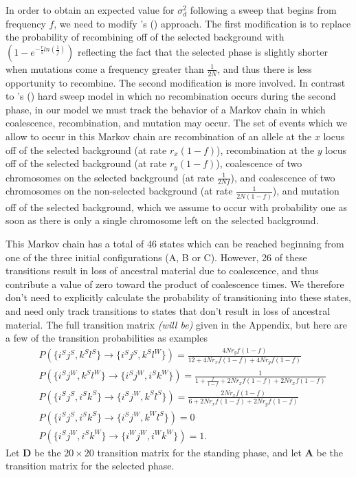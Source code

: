 \documentclass[a4paper,10pt]{article}
\newcommand{\jb}[1]{{\it\color{blue} (#1)} }
\def\citeapos#1{\citeauthor{#1}'s (\citeyear{#1})}
\begin{document}
In order to obtain an expected value for $\sigma_d^2$ following a sweep that begins from frequency $f$, we need to modify \citeapos{McVean:2006ke} approach. The first modification is to replace the probability of recombining off of the selected background with $(1 - e^{-\frac{r}{s}ln(\frac{1}{f})})$ reflecting the fact that the selected phase is slightly shorter when mutations come a frequency greater than $\frac{1}{2N}$, and thus there is less opportunity to recombine. The second modification is more involved. In contrast to \citeapos{McVean:2006ke} hard sweep model in which no recombination occurs during the second phase, in our model we must track the behavior of a Markov chain in which coalescence, recombination, and mutation may occur. The set of events which we allow to occur in this Markov chain are recombination of an allele at the $x$ locus off of the selected background (at rate $r_x\left(1-f\right)$), recombination at the $y$ locus off of the selected background (at rate $r_y\left(1-f\right)$), coalescence of two chromosomes on the selected background (at rate $\frac{1}{2Nf}$), and coalescence of two chromosomes on the non-selected background (at rate $\frac{1}{2N\left(1-f\right)}$), and mutation off of the selected background, which we assume to occur with probability one as soon as there is only a single chromosome left on the selected background.

This Markov chain has a total of 46 states which can be reached beginning from one of the three initial configurations (A, B or C). However, 26 of these transitions result in loss of ancestral material due to coalescence, and thus contribute a value of zero toward the product of coalescence times. We therefore don't need to explicitly calculate the probability of transitioning into these states, and need only track transitions to states that don't result in loss of ancestral material. The full transition matrix \jb{will be} given in the Appendix, but here are a few of the transition probabilities as examples
\begin{align}
	&P\left(\{i^Sj^S,k^Sl^S\} \rightarrow \{i^Sj^S,k^Sl^W\}\right) = \frac{4Nr_y f\left(1-f\right)}{12 + 4Nr_x f\left(1-f\right) + 4Nr_y f\left(1-f\right)} \\
	&P\left(\{i^Sj^W,k^Sl^W\} \rightarrow \{i^Sj^W,i^Sk^W\}\right) = \frac{1}{1 + \frac{f}{1-f} + 2Nr_x f\left(1-f\right) + 2Nr_x f\left(1-f\right)} \\
	&P\left(\{i^Sj^S,i^Sk^S\} \rightarrow \{i^Sj^W,k^Sl^S\}\right) = \frac{2Nr_x f\left(1-f\right)}{6 + 2Nr_x f\left(1-f\right) + 2Nr_y f\left(1-f\right)} \\
	&P\left(\{i^Sj^S,i^Sk^S\} \rightarrow \{i^Sj^W,k^Wl^S\}\right) = 0 \\
	&P\left(\{i^Sj^W,i^Sk^W\} \rightarrow \{i^Wj^W,i^Wk^W\}\right) = 1.
\end{align}
Let $\mathbf{D}$ be the $20\times 20$ transition matrix for the standing phase, and let $\mathbf{A}$ be the transition matrix for the selected phase. 
\end{document}
